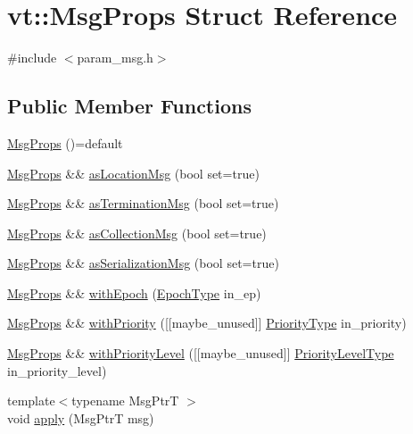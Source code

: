\hypertarget{structvt_1_1_msg_props}{}\section{vt\+:\+:Msg\+Props Struct Reference}
\label{structvt_1_1_msg_props}


{\ttfamily \#include $<$param\+\_\+msg.\+h$>$}

\subsection*{Public Member Functions}
\begin{DoxyCompactItemize}
\item 
\hyperlink{structvt_1_1_msg_props_a3285b900d253d0dde3929bfb16ba102a}{Msg\+Props} ()=default
\item 
\hyperlink{structvt_1_1_msg_props}{Msg\+Props} \&\& \hyperlink{structvt_1_1_msg_props_a932470be5f02611a13ac4e1149823247}{as\+Location\+Msg} (bool set=true)
\item 
\hyperlink{structvt_1_1_msg_props}{Msg\+Props} \&\& \hyperlink{structvt_1_1_msg_props_ac66498ad91fdc55fd27bce13a7244f17}{as\+Termination\+Msg} (bool set=true)
\item 
\hyperlink{structvt_1_1_msg_props}{Msg\+Props} \&\& \hyperlink{structvt_1_1_msg_props_ac0c0bcfbee3c18f032b6703e88bce068}{as\+Collection\+Msg} (bool set=true)
\item 
\hyperlink{structvt_1_1_msg_props}{Msg\+Props} \&\& \hyperlink{structvt_1_1_msg_props_a7b5959d7809089fb2083ed82e4ae2bd5}{as\+Serialization\+Msg} (bool set=true)
\item 
\hyperlink{structvt_1_1_msg_props}{Msg\+Props} \&\& \hyperlink{structvt_1_1_msg_props_aa3e92f5466a771b0d2fc5ec0d8825695}{with\+Epoch} (\hyperlink{namespacevt_a81d11b28122d43bf9834577e4a06440f}{Epoch\+Type} in\+\_\+ep)
\item 
\hyperlink{structvt_1_1_msg_props}{Msg\+Props} \&\& \hyperlink{structvt_1_1_msg_props_a3b21bcfae4117bc3adbdd87cecf2deae}{with\+Priority} (\mbox{[}\mbox{[}maybe\+\_\+unused\mbox{]}\mbox{]} \hyperlink{namespacevt_a86bff9f556eb761b27fc8600d006ac04}{Priority\+Type} in\+\_\+priority)
\item 
\hyperlink{structvt_1_1_msg_props}{Msg\+Props} \&\& \hyperlink{structvt_1_1_msg_props_a7d969b36e061722a3a10453fc29e41b9}{with\+Priority\+Level} (\mbox{[}\mbox{[}maybe\+\_\+unused\mbox{]}\mbox{]} \hyperlink{namespacevt_a53e07fdb3351b0f263e0dfd51b968d5e}{Priority\+Level\+Type} in\+\_\+priority\+\_\+level)
\item 
{\footnotesize template$<$typename Msg\+PtrT $>$ }\\void \hyperlink{structvt_1_1_msg_props_a412298bb043b186696ad457aa0a39422}{apply} (Msg\+PtrT msg)
\end{DoxyCompactItemize}
